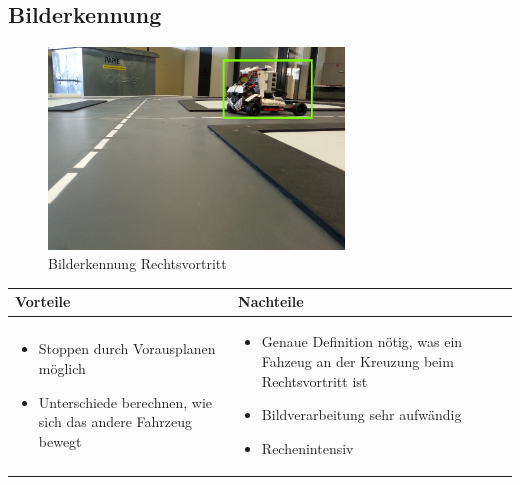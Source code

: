 \pagebreak


\subsection{Bilderkennung}

\begin{figure}[h!]%
\centering
\includegraphics[width=0.7\textwidth]{fig/rechtsvortritt_bilderkennung.png}
\caption{Bilderkennung Rechtsvortritt}
\label{fig:Bilderkennung Rechtsvortritt}
\end{figure}

\begin{table}[h]
\begin{tabular}{p{} | p{}}


 \textbf{Vorteile} & \textbf{Nachteile} \\ \hline
	 
\begin{itemize}
\item Stoppen durch Vorausplanen möglich
\item Unterschiede berechnen, wie sich das andere Fahrzeug bewegt
\end{itemize}

 
 &
 
\begin{itemize}
\item Genaue Definition nötig, was ein Fahzeug an der Kreuzung beim Rechtsvortritt ist
\item Bildverarbeitung sehr aufwändig
\item Rechenintensiv
\end{itemize}

\end{tabular}
\end{table}

